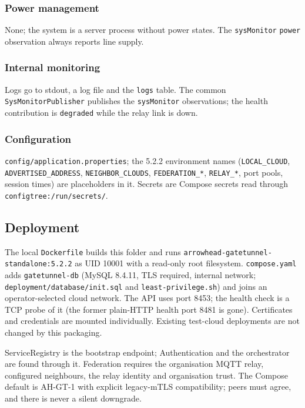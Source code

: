 \documentclass[a4paper]{arrowhead}
\begin{document}
\subsubsection{Power management}

None; the system is a server process without power states. The \texttt{sysMonitor} \texttt{power} observation always reports line supply.

\subsubsection{Internal monitoring}

Logs go to stdout, a log file and the \texttt{logs} table. The common \texttt{SysMonitorPublisher} publishes the \texttt{sysMonitor} observations; the health contribution is \texttt{degraded} while the relay link is down.

\subsubsection{Configuration}

\texttt{config/\allowbreak{}application.\allowbreak{}properties}; the 5.2.2 environment names (\texttt{LOCAL\_\allowbreak{}CLOUD}, \texttt{ADVERTISED\_\allowbreak{}ADDRESS}, \texttt{NEIGHBOR\_\allowbreak{}CLOUDS}, \texttt{FEDERATION\_\allowbreak{}*}, \texttt{RELAY\_\allowbreak{}*}, port pools, session times) are placeholders in it. Secrets are Compose secrets read through \texttt{configtree:/\allowbreak{}run/\allowbreak{}secrets/}.

\subsection{Deployment}

The local \texttt{Dockerfile} builds this folder and runs \texttt{arrowhead-\allowbreak{}gatetunnel-\allowbreak{}standalone:5.2.2} as UID 10001 with a read-only root filesystem. \texttt{compose.yaml} adds \texttt{gatetunnel-\allowbreak{}db} (MySQL 8.4.11, TLS required, internal network; \texttt{deployment/\allowbreak{}database/\allowbreak{}init.sql} and \texttt{least-\allowbreak{}privilege.sh}) and joins an operator-selected cloud network. The API uses port 8453; the health check is a TCP probe of it (the former plain-HTTP health port 8481 is gone). Certificates and credentials are mounted individually. Existing test-cloud deployments are not changed by this packaging.

ServiceRegistry is the bootstrap endpoint; Authentication and the orchestrator are found through it. Federation requires the organisation MQTT relay, configured neighbours, the relay identity and organisation trust. The Compose default is AH-GT-1 with explicit legacy-mTLS compatibility; peers must agree, and there is never a silent downgrade.
\end{document}
